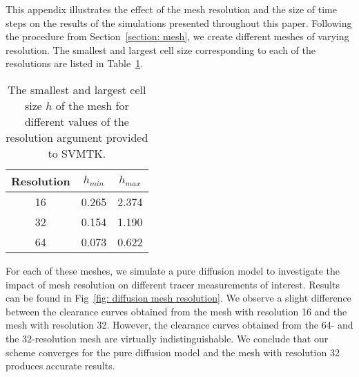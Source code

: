 \documentclass[10pt]{article}
\newcommand{\1}{^{(1)}}
\newcommand{\2}{^{(2)}}
\begin{document}
This appendix illustrates the effect of the mesh resolution and the size of time steps on the results of the simulations presented throughout this paper.
Following the procedure from Section~\ref{section: mesh}, we create different meshes of varying resolution. The smallest and largest cell size corresponding to each of the resolutions are listed in Table~\ref{tab:mesh-resolution}. 
\begin{table}[h]
    \centering
    \captionsetup{width=0.6\textwidth}
    \begin{tabular}{c|c|c}
        Resolution   & $h_{min}$ & $h_{max}$\\
        \hline
    	16  &  0.265  &  2.374  \\
    	32  &  0.154  &  1.190  \\
    	64  &  0.073  &  0.622  \\
    \end{tabular}
    \caption{The smallest and largest cell size $h$ of the mesh for different values of the resolution argument provided to SVMTK.}
    \label{tab:mesh-resolution}
\end{table}
For each of these meshes, we simulate a pure diffusion model to investigate the impact of mesh resolution on different tracer measurements of interest. Results can be found in Fig~\ref{fig: diffusion mesh resolution}. We observe a slight difference between the clearance curves obtained from the mesh with resolution 16 and the mesh with resolution 32.
However, the clearance curves obtained from the 64- and the 32-resolution mesh are virtually indistinguishable.
We conclude that our scheme converges for the pure diffusion model and the mesh with resolution 32 produces accurate results. 
\end{document}
